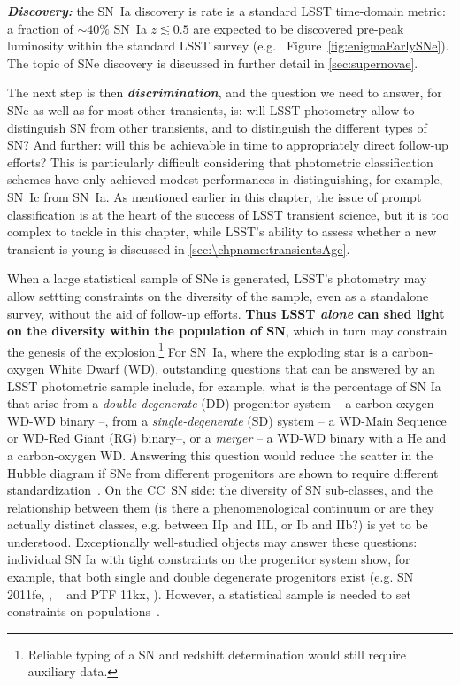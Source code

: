 {\bf \emph{Discovery:}} the SN~Ia discovery is rate is a standard LSST time-domain metric: a
fraction of $\sim40\%$ SN~Ia $z\lesssim0.5$ are expected to be discovered pre-peak
luminosity within the standard LSST survey
(e.g. ~Figure~\ref{fig:enigmaEarlySNe}). The
topic of SNe discovery is discussed in further detail in
\ref{sec:supernovae}.

The next step is then {\bf\emph{discrimination}}, and the question we need
to answer, for SNe as well as for most other transients, is: will LSST
photometry allow to distinguish SN from other transients, and to
distinguish the different types of SN? And further: will this be
achievable in time to appropriately direct follow-up efforts? This is
particularly difficult considering that photometric classification
schemes have only achieved modest performances in distinguishing, for
example, SN~Ic from SN~Ia. As mentioned earlier in this chapter, the issue
of prompt classification is at the heart of the success of LSST
transient science, but it is too complex to tackle in this chapter,
while LSST's ability to assess whether a new transient is young is discussed
in \autoref{sec:\chpname:transientsAge}.

When a large statistical sample of SNe is generated, LSST's photometry
may allow settting constraints on the diversity of the sample, even as a
standalone survey, without the aid of follow-up efforts.  {\bf Thus
  LSST \emph{alone} can shed light on the diversity within the
  population of SN}, which in turn may constrain the genesis of the
explosion.\footnote{Reliable typing of a SN and redshift determination
  would still require auxiliary data.} For SN~Ia, where the exploding
star is a carbon-oxygen White Dwarf (WD), outstanding questions
that can be answered by an LSST photometric sample include, for
example, what is the percentage of SN Ia that arise from a
\emph{double-degenerate} (DD) progenitor system -- a carbon-oxygen WD-WD binary
--, from a \emph {single-degenerate} (SD) system -- a WD-Main Sequence
 or WD-Red Giant (RG) binary--, or a \emph{merger} -- a WD-WD
 binary with a He and a carbon-oxygen WD.
 Answering this question would reduce the
scatter in the Hubble diagram if SNe from different progenitors are
shown to require different standardization~\citep{Scolnic2014}. On the
CC~SN side: the diversity of SN sub-classes, and the relationship
between them (is there a phenomenological continuum or are they actually
distinct classes, e.g. between IIp and IIL, or Ib and IIb?) is yet to
be understood. Exceptionally well-studied objects may answer these
questions: individual SN Ia with tight constraints on the progenitor
system show, for example, that both single and double degenerate
progenitors exist (e.g. SN 2011fe, \citealt{Li11}, ~\citealt{Olling15}
and PTF 11kx, \citealt{Dilday12}). However, a statistical sample is
needed to set constraints on populations~\citep{Hayden2010, Bianco11}.

